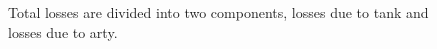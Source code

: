 \documentclass[]{article}
\begin{document}
\begin{figure}
\centering
{}\hspace{5pt}
\caption{
Total losses are divided into two components, losses due to tank and losses due to arty.} 
\end{figure}
\end{document}
